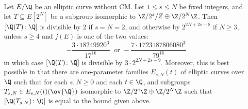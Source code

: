\begin{frame}[plain]
\begin{thm}
Let $E/\Q$ be an elliptic curve without CM. Let $1 \leq s \leq N$ be fixed integers, and let $T \subseteq E[2^N]$ be a subgroup isomorphic to $\Z/2^s/Z \oplus \Z/2^N \Z$. Then $[\Q(T) \colon \Q]$ is divisible by 2 if $s=N=2$, and otherwise by $2^{2N+2s-8}$ if $N \geq 3$, unless $s \geq 4$ and $j(E)$ is one of the two values:
	\[
	- \dfrac{3 \cdot 18249920^3}{17^{16}}\; \text{ or } - \dfrac{7 \cdot 1723187806080^3}{79^{16}}
	\]
in which case $[\Q(T) \colon \Q]$ is divisible by $3 \cdot 2^{2N+2s-9}$. Moreover, this is best possible in that there are one-parameter families $E_{s,N}(t)$ of elliptic curves over $\Q$ such that for each $s, N \geq 0$ and each $t \in \Q$, and subgroups $T_{s,N} \in E_{s,N}(t)(\ov{\Q})$ isomorphic to $\Z/2^s\Z \oplus \Z/2^N\Z$ such that $[\Q(T_{s,N}) \colon \Q]$ is equal to the bound given above. 
\end{thm}
\end{frame}


\begin{frame}[plain]
\end{frame}


